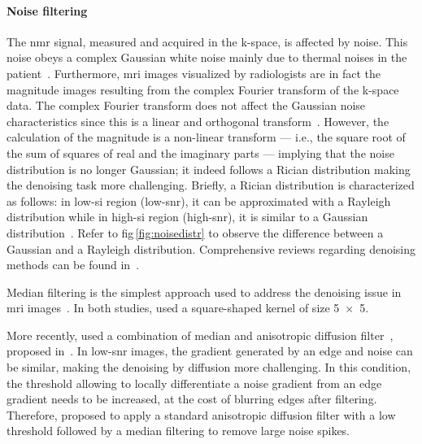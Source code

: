 \paragraph{Noise filtering} The \ac{nmr} signal, measured and acquired in the k-space, is affected by noise.
This noise obeys a complex Gaussian white noise mainly due to thermal noises in the patient~\cite{Nowak1999}.
Furthermore, \ac{mri} images visualized by radiologists are in fact the magnitude images resulting from the complex Fourier transform of the k-space data.
The complex Fourier transform does not affect the Gaussian noise characteristics since this is a linear and orthogonal transform~\cite{Nowak1999}.
However, the calculation of the magnitude is a non-linear transform --- i.e., the square root of the sum of squares of real and the imaginary parts --- implying that the noise distribution is no longer Gaussian; it indeed follows a Rician distribution making the denoising task more challenging.
Briefly, a Rician distribution is characterized as follows: in low-\ac{si} region (low-\ac{snr}), it can be approximated with a Rayleigh distribution while in high-\ac{si} region (high-\ac{snr}), it is similar to a Gaussian distribution~\cite{Manjon2008}.
Refer to \acs{fig}\,\ref{fig:noisedistr} to observe the difference between a Gaussian and a Rayleigh distribution.
Comprehensive reviews regarding denoising methods can be found in~\cite{Buades2005,Mohan2014}.

Median filtering is the simplest approach used to address the denoising issue in \ac{mri} images~\cite{Ozer2009,Ozer2010}.
In both studies, \citeauthor{Ozer2010} used a square-shaped kernel of size \SI[product-units=repeat]{5x5}{\px}.%

More recently, \citeauthor{rampun2016quantitative} used a combination of median and anisotropic diffusion filter~\cite{rampun2015classifying,rampun2016computer,rampun2016computerb,rampun2016quantitative}, proposed in~\cite{ling2002smoothing}.
In low-\ac{snr} images, the gradient generated by an edge and noise can be similar, making the denoising by diffusion more challenging.
In this condition, the threshold allowing to locally differentiate a noise gradient from an edge gradient needs to be increased, at the cost of blurring edges after filtering.
Therefore, \citeauthor{ling2002smoothing} proposed to apply a standard anisotropic diffusion filter with a low threshold followed by a median filtering to remove large noise spikes.

